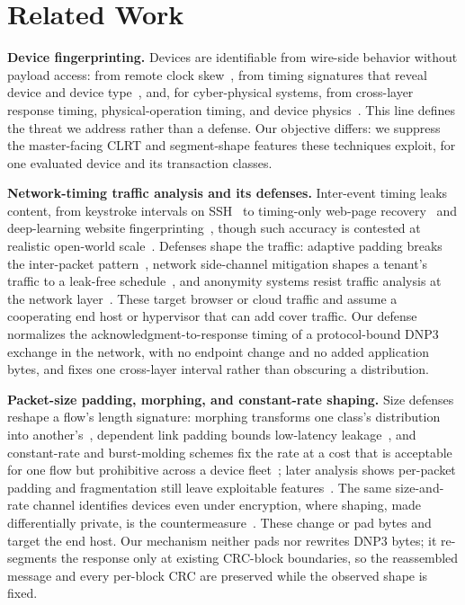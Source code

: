 \documentclass[conference]{IEEEtran}
\begin{document}
\section{Related Work}
\label{sec:related}

\noindent\textbf{Device fingerprinting.} Devices are identifiable from wire-side behavior without
payload access: from remote clock skew~\cite{kohno2005}, from timing signatures that reveal device and
device type~\cite{gtid2015}, and, for cyber-physical systems, from cross-layer response timing,
physical-operation timing, and device physics~\cite{formby2016,gu2018}. This line defines the threat
we address rather than a defense. Our objective differs: we suppress the master-facing CLRT and
segment-shape features these techniques exploit, for one evaluated device and its transaction classes.

\noindent\textbf{Network-timing traffic analysis and its defenses.} Inter-event timing leaks content,
from keystroke intervals on SSH~\cite{song2001} to timing-only web-page recovery~\cite{feghhi2016} and
deep-learning website fingerprinting~\cite{sirinam2018}, though such accuracy is contested at realistic
open-world scale~\cite{panchenko2016}. Defenses shape the traffic: adaptive padding breaks the
inter-packet pattern~\cite{juarez2016}, network side-channel mitigation shapes a tenant's
traffic to a leak-free schedule~\cite{pacer2022}, and anonymity systems resist traffic analysis at the
network layer~\cite{hornet2015,taranet2018}. These target browser or cloud traffic and assume a
cooperating end host or hypervisor that can add cover traffic. Our defense normalizes the
acknowledgment-to-response timing of a protocol-bound DNP3 exchange in the network, with no endpoint
change and no added application bytes, and fixes one cross-layer interval rather than obscuring a
distribution.

\noindent\textbf{Packet-size padding, morphing, and constant-rate shaping.} Size defenses reshape a
flow's length signature: morphing transforms one class's distribution into another's~\cite{wright2009},
dependent link padding bounds low-latency leakage~\cite{wang2008dlp}, and constant-rate and
burst-molding schemes fix the rate at a cost that is acceptable for one flow but prohibitive across a
device fleet~\cite{tamaraw2014,walkietalkie2017}; later analysis shows per-packet padding and
fragmentation still leave exploitable features~\cite{dyer2012}. The same size-and-rate channel
identifies devices even under encryption, where shaping, made differentially private, is the
countermeasure~\cite{apthorpe2019,netshaper2024}. These change or pad bytes and target the end host.
Our mechanism neither pads nor rewrites DNP3 bytes; it re-segments the response only at existing
CRC-block boundaries, so the reassembled message and every per-block CRC are preserved while the
observed shape is fixed.
\end{document}
